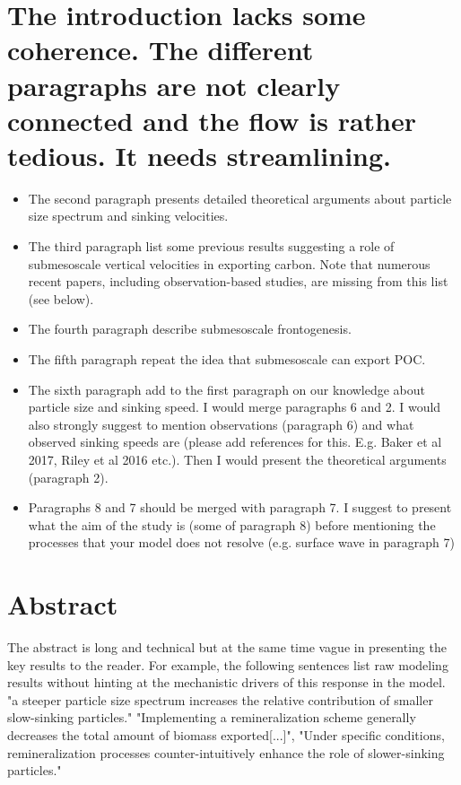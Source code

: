 \documentclass[article,linenumbers]{agujournal2018}
\begin{document}
	
	
	\section*{The introduction lacks some coherence. The different paragraphs are not clearly connected and the flow is rather tedious. It needs streamlining. }
		\begin{itemize}
	\item	The second paragraph presents detailed theoretical arguments about particle size spectrum and sinking velocities. 
	\item	The third paragraph list some previous results suggesting a role of submesoscale vertical velocities in exporting carbon. Note that numerous recent papers, including observation-based studies, are missing from this list (see below).
	\item	The fourth paragraph describe submesoscale frontogenesis.
	\item	The fifth paragraph repeat the idea that submesoscale can export POC.
	\item	The sixth paragraph add to the first paragraph on our knowledge about particle size and sinking speed. I would merge paragraphs 6 and 2. I would also strongly suggest to mention observations (paragraph 6) and what observed sinking speeds are (please add references for this. E.g. Baker et al 2017, Riley et al 2016 etc.). Then I would present the theoretical arguments (paragraph 2). 
	\item	Paragraphs 8 and 7 should be merged with paragraph 7. I suggest to present what the aim of the study is (some of paragraph 8) before mentioning the processes that your model does not resolve (e.g. surface wave in paragraph 7)
		\end{itemize}
	
	\section*{Abstract}
	The abstract is long and technical but at the same time vague in presenting the key results to the reader. For example, the following sentences list raw modeling results without hinting at the mechanistic drivers of this response in the model. 
	"a steeper particle size spectrum increases the relative contribution of smaller slow-sinking particles." "Implementing a remineralization scheme generally decreases the total amount of biomass exported[...]", "Under specific conditions, remineralization processes counter-intuitively enhance the role of slower-sinking particles."
	
\end{document}
